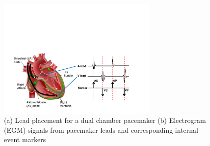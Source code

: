 %
 \begin{figure}[!t]
	\centering
	\includegraphics[width=0.7\textwidth]{figs/egm.pdf}
	
	\caption{\small (a) Lead placement for a dual chamber pacemaker (b) Electrogram (EGM) signals from pacemaker leads and corresponding internal event markers}
	\label{fig:probes}
\end{figure} 
